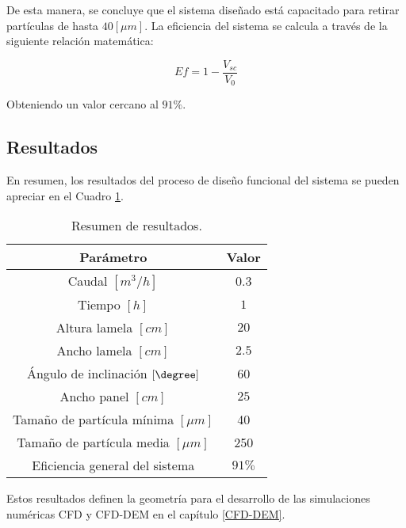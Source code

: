 De esta manera, se concluye que el sistema dise\~nado est\'a capacitado para retirar part\'iculas de hasta $40 [\mu m]$. La eficiencia del sistema se calcula a trav\'es de la siguiente relaci\'on matem\'atica:

\begin{equation}
	Ef = 1 - \frac{V_{sc}}{V_0}
\end{equation} 

\noindent
\justify

Obteniendo un valor cercano al $91 \%$.

\newpage

\subsection{Resultados}

\noindent
\justify

En resumen, los resultados del proceso de dise\~no funcional del sistema se pueden apreciar en el Cuadro \ref{resul_dis}.

\begin{table}[h!]
	\centering
	\begin{tabular}{c|c}
		\hline
		\textbf{Par\'ametro} & \textbf{Valor} \\ \hline
		Caudal $\left[m^3 /h \right]$ & $0.3$ \\ \hline
		Tiempo $[h]$ & $1$ \\ \hline
		Altura lamela $[cm]$ & $20$ \\ \hline
		Ancho lamela $[cm]$ & $2.5$ \\ \hline
		\'Angulo de inclinaci\'on $[\degree ]$ & 60 \\ \hline
		Ancho panel $[cm]$ & $25$ \\ \hline
		Tama\~no de part\'icula m\'inima $[\mu m]$ & 40 \\ \hline
		Tama\~no de part\'icula media $[\mu m]$ & 250 \\ \hline
		Eficiencia general del sistema & $91 \%$ \\ \hline
	\end{tabular}
	\caption{Resumen de resultados.}
	\label{resul_dis}
\end{table}

\noindent
\justify

Estos resultados definen la geometr\'ia para el desarrollo de las simulaciones num\'ericas CFD y CFD-DEM en el cap\'itulo \ref{CFD-DEM}.
